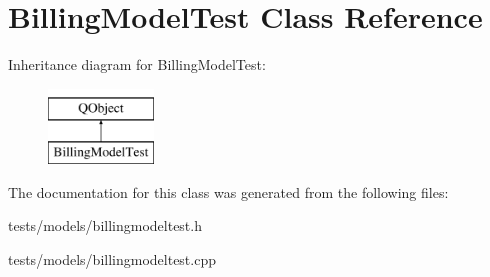 \hypertarget{classBillingModelTest}{\section{Billing\+Model\+Test Class Reference}
\label{classBillingModelTest}
}
Inheritance diagram for Billing\+Model\+Test\+:\begin{figure}[H]
\begin{center}
\leavevmode
\includegraphics[height=2.000000cm]{dc/d0c/classBillingModelTest}
\end{center}
\end{figure}


The documentation for this class was generated from the following files\+:\begin{DoxyCompactItemize}
\item 
tests/models/billingmodeltest.\+h\item 
tests/models/billingmodeltest.\+cpp\end{DoxyCompactItemize}
